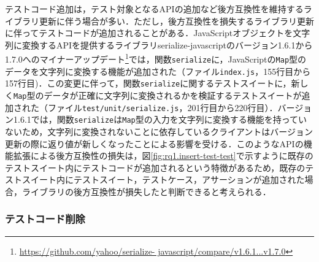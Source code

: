 \documentclass[submit]{ipsj}
\begin{document}
テストコード追加は，テスト対象となるAPIの追加など後方互換性を維持するライブラリ更新に伴う場合が多い．ただし，後方互換性を損失するライブラリ更新に伴ってテストコードが追加されることがある．JavaScriptオブジェクトを文字列に変換するAPIを提供するライブラリserialize-javascriptのバージョン1.6.1から1.7.0へのマイナーアップデート\footnote{\url{https://github.com/yahoo/serialize- javascript/compare/v1.6.1...v1.7.0}}では，関数{\verb|serialize|}に，JavaScriptの{\verb|Map|}型のデータを文字列に変換する機能が追加された（ファイル{\verb|index.js|}，155行目から157行目)．この変更に伴って，関数{\verb|serialize|}に関するテストスイートに，新しく{\verb|Map|}型のデータが正確に文字列に変換されるかを検証するテストスイートが追加された（ファイル{\verb|test/unit/serialize.js|}，201行目から220行目）．バージョン1.6.1では，関数{\verb|serialize|}は{\verb|Map|}型の入力を文字列に変換する機能を持っていないため，文字列に変換されないことに依存しているクライアントはバージョン更新の際に返り値が新しくなったことによる影響を受ける．このようなAPIの機能拡張による後方互換性の損失は，図\ref{fig:rq1.insert-test-test}で示すように既存のテストスイート内にテストコードが追加されるという特徴があるため，既存のテストスイート内にテストスイート，テストケース，アサーションが追加された場合，ライブラリの後方互換性が損失したと判断できると考えられる．

\subsubsection{テストコード削除}\label{subsec:delete-test}


\end{document}
